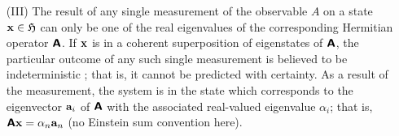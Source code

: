 {\begin{itemize}
Observables are said to be {\em compatible} if they can be defined
simultaneously with arbitrary accuracy; i.e., if they are
``independent.'' A criterion for compatibility is the {\em commutator.}
Two observables ${ \textsf{\textbf{A}}},{ \textsf{\textbf{B}}}$ are compatible, if their {\em
commutator} vanishes; that is,
if $\left[
{ \textsf{\textbf{A}}},
{ \textsf{\textbf{B}}}
\right] =
{ \textsf{\textbf{A}}}
{ \textsf{\textbf{B}}}  -
{ \textsf{\textbf{B}}}
{ \textsf{\textbf{A}}}   =0$.


It has recently been demonstrated that
(by an analog embodiment using
particle beams) every Hermitian operator in a finite dimensional Hilbert
space can be experimentally realized \cite{rzbb}.

\item[(III)]
The result of any single measurement of the observable $A$
on a state ${\bf x}\in {\frak H}$
can only be one of the real eigenvalues of the corresponding
Hermitian operator $ \textsf{\textbf{A}}$.
If ${\bf x}$ is in a coherent superposition of eigenstates of $ \textsf{\textbf{A}}$, the
particular outcome of any such single measurement is believed to be indeterministic \cite{born-26-1,born-26-2,zeil-05_nature_ofQuantum};
that is,
it cannot be predicted with certainty. As a
result of the measurement,
the system is in the state which corresponds to the eigenvector ${\bf a}_i$ of
$\textsf{\textbf{A}}$ with the associated real-valued eigenvalue
$\alpha_i$; that is, $\textsf{\textbf{A}} {\bf x}=\alpha_n {\bf a}_n$ (no Einstein sum convention here).


\end{itemize}}

